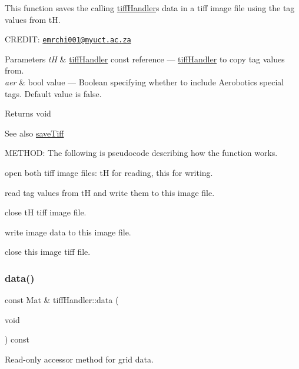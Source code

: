 This function saves the calling \hyperlink{classtiffHandler}{tiff\+Handler}\textquotesingle{}s data in a tiff image file using the tag values from tH. 

C\+R\+E\+D\+IT\+: \href{mailto:emrchi001@myuct.ac.za}{\tt emrchi001@myuct.\+ac.\+za}


\begin{DoxyParams}{Parameters}
{\em tH} & \hyperlink{classtiffHandler}{tiff\+Handler} const reference --- \hyperlink{classtiffHandler}{tiff\+Handler} to copy tag values from. \\
\hline
{\em aer} & bool value --- Boolean specifying whether to include Aerobotics special tags. Default value is false.\\
\hline
\end{DoxyParams}
\begin{DoxyReturn}{Returns}
void
\end{DoxyReturn}
\begin{DoxySeeAlso}{See also}
\hyperlink{classtiffHandler_a691f65932d0dddc162689603efe9b56b}{save\+Tiff}
\end{DoxySeeAlso}
M\+E\+T\+H\+OD\+: The following is pseudocode describing how the function works.
\begin{DoxyEnumerate}
\item open both tiff image files\+: tH for reading, this for writing.
\item read tag values from tH and write them to this image file.
\item close tH tiff image file.
\item write image data to this image file.
\item close this image tiff file. 
\end{DoxyEnumerate}\mbox{\label{classtiffHandler_aa534e76fcbedbc1153f1b61661d4d8c2}} 
\subsubsection{\texorpdfstring{data()}{data()}}
{\footnotesize\ttfamily const Mat \& tiff\+Handler\+::data (\begin{DoxyParamCaption}\item[{void}]{ }\end{DoxyParamCaption}) const}



Read-\/only accessor method for grid data. 

